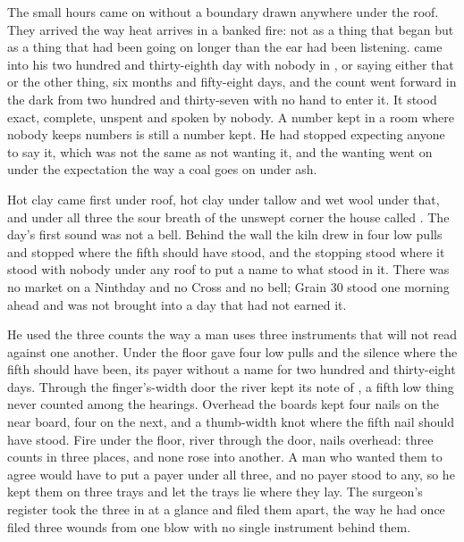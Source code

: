 
The small hours came on without a boundary drawn anywhere under the roof. They arrived the way heat arrives in a banked fire: not as a thing that began but as a thing that had been going on longer than the ear had been listening.  came into his two hundred and thirty-eighth day with nobody in ,  or  saying either that or the other thing, six months and fifty-eight days, and the count went forward in the dark from two hundred and thirty-seven with no hand to enter it. It stood exact, complete, unspent and spoken by nobody. A number kept in a room where nobody keeps numbers is still a number kept. He had stopped expecting anyone to say it, which was not the same as not wanting it, and the wanting went on under the expectation the way a coal goes on under ash.

Hot clay came first under  roof, hot clay under tallow and wet wool under that, and under all three the sour  breath of the unswept corner the house called . The day's first sound was not a bell. Behind the wall the kiln drew in four low pulls and stopped where the fifth should have stood, and the stopping stood where it stood with nobody under any roof to put a name to what stood in it. There was no market on a Ninthday and no Cross and no bell; Grain 30 stood one morning ahead and was not brought into a day that had not earned it.

He used the three counts the way a man uses three instruments that will not read against one another. Under the floor  gave four low pulls and the silence where the fifth should have been, its payer without a name for two hundred and thirty-eight days. Through the finger's-width door the river kept its note of , a fifth low thing never counted among the hearings. Overhead the boards kept four nails on the near board, four on the next, and a thumb-width knot where the fifth nail should have stood. Fire under the floor, river through the door, nails overhead: three counts in three places, and none rose into another. A man who wanted them to agree would have to put a payer under all three, and no payer stood to any, so he kept them on three trays and let the trays lie where they lay. The surgeon's register took the three in at a glance and filed them apart, the way he had once filed three wounds from one blow with no single instrument behind them.

